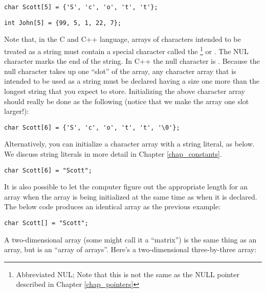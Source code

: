 \begin{lstlisting}
char Scott[5] = {'S', 'c', 'o', 't', 't'};	
\end{lstlisting}

\begin{lstlisting}
int John[5] = {99, 5, 1, 22, 7};
\end{lstlisting}
	
	
Note that, in the C and C++ language, arrays of characters intended to be treated as a string must contain a special character called the \footnote{Abbreviated NUL; Note that this is not the same as the NULL pointer described in Chapter \ref{chap_pointers}} or . The NUL character marks the end of the string. In C++ the null character is . Because the null character takes up one ``slot'' of the array, any character array that is intended to be used as a string must be declared having a size one more than the longest string that you expect to store. Initializing the above character array should really be done as the following (notice that we make the array one slot larger!):

\begin{lstlisting}
char Scott[6] = {'S', 'c', 'o', 't', 't', '\0'};	
\end{lstlisting}

Alternatively, you can initialize a character array with a string literal, as below. 
We discuss string literals in more detail in Chapter \ref{chap_constants}.

\begin{lstlisting}
char Scott[6] = "Scott";	
\end{lstlisting}

It is also possible to let the computer figure out the appropriate length for an array when the array is being initialized at the same time as when it is declared. 
The below code produces an identical array as the previous example:

\begin{lstlisting}
char Scott[] = "Scott";	
\end{lstlisting}


A two-dimensional array (some might call it a ``matrix'') is the same thing as an array, but is an ``array of arrays''.
Here's a two-dimensional three-by-three array:

